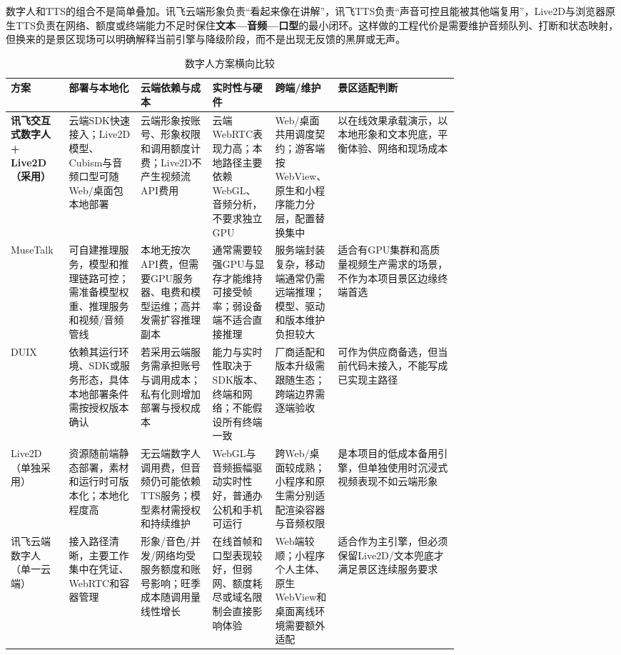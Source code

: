 数字人和TTS的组合不是简单叠加。讯飞云端形象负责“看起来像在讲解”，讯飞TTS负责“声音可控且能被其他端复用”，Live2D与浏览器原生TTS负责在网络、额度或终端能力不足时保住\textbf{文本—音频—口型}的最小闭环。这样做的工程代价是需要维护音频队列、打断和状态映射，但换来的是景区现场可以明确解释当前引擎与降级阶段，而不是出现无反馈的黑屏或无声。

\begin{landscape}
\begin{table}[H]
  \centering
  \caption{数字人方案横向比较}\label{tab:compare-digital-human}
  \small
  \renewcommand{\arraystretch}{1.18}
  \begin{tabularx}{\linewidth}{p{0.13\linewidth}p{0.16\linewidth}p{0.16\linewidth}p{0.14\linewidth}p{0.14\linewidth}X}
    \toprule
    方案 & 部署与本地化 & 云端依赖与成本 & 实时性与硬件 & 跨端/维护 & 景区适配判断 \\
    \midrule
    \textbf{讯飞交互式数字人 + Live2D（采用）} & 云端SDK快速接入；Live2D模型、Cubism与音频口型可随Web/桌面包本地部署 & 云端形象按账号、形象权限和调用额度计费；Live2D不产生视频流API费用 & 云端WebRTC表现力高；本地路径主要依赖WebGL、音频分析，不要求独立GPU & Web/桌面共用调度契约；游客端按WebView、原生和小程序能力分层，配置替换集中 & 以在线效果承载演示，以本地形象和文本兜底，平衡体验、网络和现场成本 \\
    \midrule
    MuseTalk & 可自建推理服务，模型和推理链路可控；需准备模型权重、推理服务和视频/音频管线 & 本地无按次API费，但需要GPU服务器、电费和模型运维；高并发需扩容推理副本 & 通常需要较强GPU与显存才能维持可接受帧率；弱设备端不适合直接推理 & 服务端封装复杂，移动端通常仍需远端推理；模型、驱动和版本维护负担较大 & 适合有GPU集群和高质量视频生产需求的场景，不作为本项目景区边缘终端首选 \\
    \midrule
    DUIX & 依赖其运行环境、SDK或服务形态，具体本地部署条件需按授权版本确认 & 若采用云端服务需承担账号与调用成本；私有化则增加部署与授权成本 & 能力与实时性取决于SDK版本、终端和网络；不能假设所有终端一致 & 厂商适配和版本升级需跟随生态；跨端边界需逐端验收 & 可作为供应商备选，但当前代码未接入，不能写成已实现主路径 \\
    \midrule
    Live2D（单独采用） & 资源随前端静态部署，素材和运行时可版本化；本地化程度高 & 无云端数字人调用费，但音频仍可能依赖TTS服务；模型素材需授权和持续维护 & WebGL与音频振幅驱动实时性好，普通办公机和手机可运行 & 跨Web/桌面较成熟；小程序和原生需分别适配渲染容器与音频权限 & 是本项目的低成本备用引擎，但单独使用时沉浸式视频表现不如云端形象 \\
    \midrule
    讯飞云端数字人（单一云端） & 接入路径清晰，主要工作集中在凭证、WebRTC和容器管理 & 形象/音色/并发/网络均受服务额度和账号影响；旺季成本随调用量线性增长 & 在线首帧和口型表现较好，但弱网、额度耗尽或域名限制会直接影响体验 & Web端较顺；小程序个人主体、原生WebView和桌面离线环境需要额外适配 & 适合作为主引擎，但必须保留Live2D/文本兜底才满足景区连续服务要求 \\
    \bottomrule
  \end{tabularx}
\end{table}


\end{landscape}
